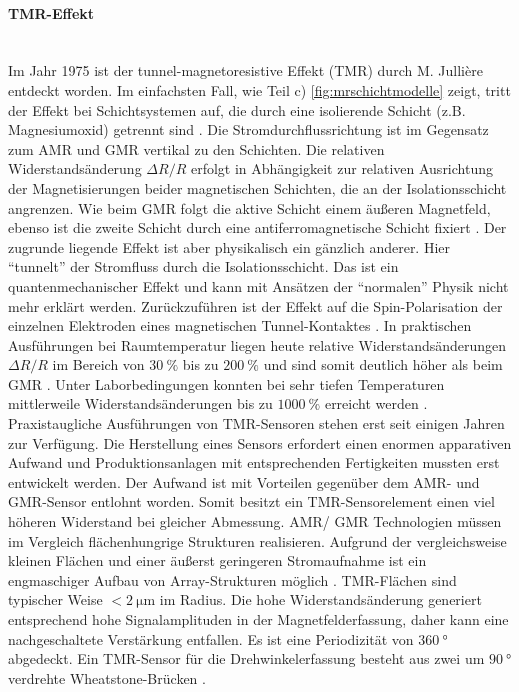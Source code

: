 \paragraph{TMR-Effekt}\label{par:TMR}$~$\\


Im Jahr 1975 ist der tunnel-magnetoresistive Effekt (TMR) durch M. Jullière entdeckt worden. Im einfachsten Fall, wie Teil c) \autoref{fig:mrschichtmodelle} zeigt, tritt der Effekt bei Schichtsystemen auf, die durch eine isolierende Schicht (z.B. Magnesiumoxid) getrennt sind \cite{Lemme2016}. Die Stromdurchflussrichtung ist im Gegensatz zum AMR und GMR vertikal zu den Schichten. Die relativen Widerstandsänderung $\Delta R/R$ erfolgt in Abhängigkeit zur relativen Ausrichtung der Magnetisierungen beider magnetischen Schichten, die an der Isolationsschicht angrenzen.
\newline
Wie beim GMR folgt die aktive Schicht einem äußeren Magnetfeld, ebenso ist die zweite Schicht durch eine antiferromagnetische Schicht fixiert  \cite{Tille2020}. Der zugrunde liegende Effekt ist aber physikalisch ein gänzlich anderer. Hier ``tunnelt'' der Stromfluss durch die Isolationsschicht. Das ist ein quantenmechanischer Effekt und kann mit Ansätzen der ``normalen'' Physik nicht mehr erklärt werden. Zurückzuführen ist der Effekt auf die Spin-Polarisation der einzelnen Elektroden eines magnetischen Tunnel-Kontaktes \cite{Tille2020}.
\newline
In praktischen Ausführungen bei Raumtemperatur liegen heute relative Widerstandsänderungen $\Delta R/R$ im Bereich von $\SI{30}{\percent}$ bis zu $\SI{200}{\percent}$ und sind somit deutlich höher als beim GMR \cite{Tille2020}. Unter Laborbedingungen konnten bei sehr tiefen Temperaturen mittlerweile Widerstandsänderungen bis zu $\SI{1000}{\percent}$ erreicht werden \cite{Lemme2016}.
\newline
Praxistaugliche Ausführungen von TMR-Sensoren stehen erst seit einigen Jahren zur Verfügung. Die Herstellung eines Sensors erfordert einen enormen apparativen Aufwand und Produktionsanlagen mit entsprechenden Fertigkeiten mussten erst entwickelt werden. Der Aufwand ist mit Vorteilen gegenüber dem AMR- und GMR-Sensor entlohnt worden.
Somit besitzt ein TMR-Sensorelement einen viel höheren Widerstand bei gleicher Abmessung. AMR/ GMR Technologien müssen im Vergleich flächenhungrige Strukturen realisieren. Aufgrund der vergleichsweise kleinen Flächen und einer äußerst geringeren Stromaufnahme ist ein engmaschiger Aufbau von Array-Strukturen möglich \cite{Lemme2016}. TMR-Flächen sind typischer Weise $< \SI{2}{\micro\metre}$ im  Radius. Die hohe Widerstandsänderung generiert entsprechend hohe Signalamplituden in der Magnetfelderfassung, daher kann eine nachgeschaltete Verstärkung entfallen. Es ist eine Periodizität von $\SI{360}{\degree}$ abgedeckt. Ein TMR-Sensor für die Drehwinkelerfassung besteht aus zwei um $\SI{90}{\degree}$ verdrehte Wheatstone-Brücken \cite{TDK2016}.



